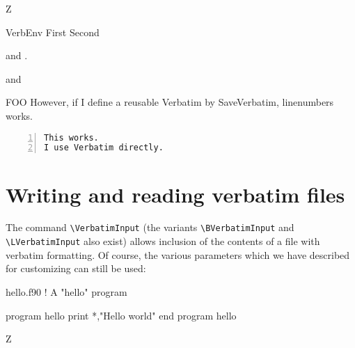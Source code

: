 \documentclass[twoside]{article}
\newcommand\cs[1]{\texttt{\textbackslash#1}}
\begin{document}
\begin{SideBySideExample}
  Z
  \begin{SaveVerbatim}[gobble=5]{VerbEnv}
    First
    Second
  \end{SaveVerbatim}

  and .

   and
\end{SideBySideExample}


\begin{SideBySideExample}
\begin{SaveVerbatim}{FOO}
However, if I define a
reusable Verbatim by 
SaveVerbatim,
linenumbers works.
\end{SaveVerbatim}

\begin{Verbatim}[numbers=left]
This works.
I use Verbatim directly.
\end{Verbatim}

\end{SideBySideExample}


\clearpage

\section{Writing and reading verbatim files}
\label{sec:VerbatimInclude}

  The command \cs{VerbatimInput} (the variants \cs{BVerbatimInput} and
\cs{LVerbatimInput} also exist) allows inclusion of the contents of a file
with verbatim formatting. Of course, the various parameters which we have
described for customizing can still be used:


\typeout{*************************************}
\typeout{*************************************}

\begin{VerbatimOut}{hello.f90}
  ! A "hello" program

  program hello
    print *,"Hello world"
  end program hello
\end{VerbatimOut}

\begin{SideBySideExample}
  Z



\end{SideBySideExample}
\end{document}
